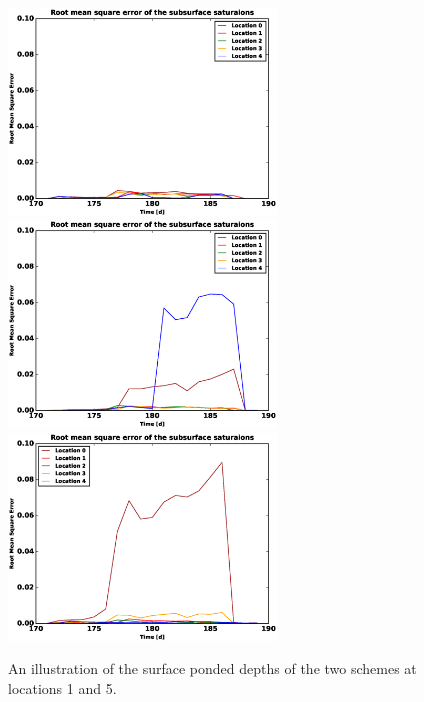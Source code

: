 \documentclass[review]{elsarticle}
\begin{document}
\begin{figure}[!htpb]
\centering
\includegraphics[height = 5.5cm, width=10.cm]{figures/comparison/regular/error.eps}
\includegraphics[height = 5.5cm, width=10.cm]{figures/comparison/dist/Elev-grad1.5m/error.eps}
\includegraphics[height = 5.5cm, width=10.cm]{figures/comparison/dist/Elev-grad2.5m/error.eps}
\caption{An illustration of the surface ponded depths of the two schemes at locations 1 and 5.}
\label{error-plots}
\end{figure}


\end{document}

